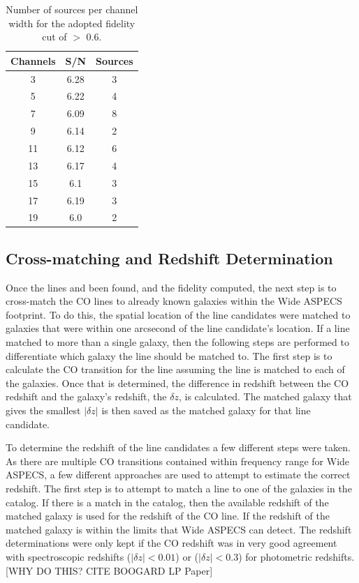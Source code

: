 \begin{table}
\centering
\caption{Number of sources per channel width for the adopted fidelity cut of $>$ 0.6.}
\begin{tabular}{ccc}
Channels & S/N & Sources \\
\hline
3 & 6.28 & 3 \\
5 & 6.22 & 4 \\
7 & 6.09 & 8 \\
9 & 6.14 & 2 \\
11 & 6.12 & 6 \\
13 & 6.17 & 4 \\
15 & 6.1 & 3 \\
17 & 6.19 & 3 \\
19 & 6.0 & 2 \\
\end{tabular}
\end{table}\label{table:Fid_NumTable}

\subsection{Cross-matching and Redshift Determination}

Once the lines and been found, and the fidelity computed, the next step is to cross-match the CO lines to already known galaxies within the Wide ASPECS footprint. To do this, the spatial location of the line candidates were matched to galaxies that were within one arcsecond of the line candidate's location. If a line matched to more than a single galaxy, then the following steps are performed to differentiate which galaxy the line should be matched to. The first step is to calculate the CO transition for the line assuming the line is matched to each of the galaxies. Once that is determined, the difference in redshift between the CO redshift and the galaxy's redshift, the $\delta z$, is calculated. The matched galaxy that gives the smallest $|\delta z|$ is then saved as the matched galaxy for that line candidate. 

To determine the redshift of the line candidates a few different steps were taken. As there are multiple CO transitions contained within frequency range for Wide ASPECS, a few different approaches are used to attempt to estimate the correct redshift. The first step is to attempt to match a line to one of the galaxies in the catalog. If there is a match in the catalog, then the available redshift of the matched galaxy is used for the redshift of the CO line. If the redshift of the matched galaxy is within the limits that Wide ASPECS can detect. The redshift determinations were only kept if the CO redshift was in very good agreement with spectroscopic redshifts ($|\delta z| < 0.01$) or ($|\delta z| < 0.3$) for photometric redshifts. [WHY DO THIS? CITE BOOGARD LP Paper]

